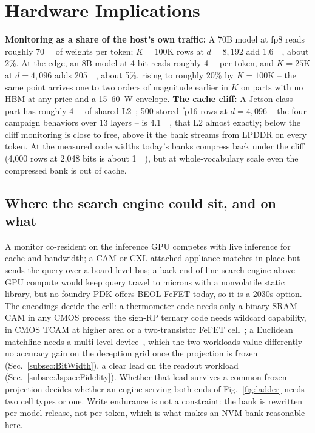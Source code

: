 \documentclass[conference]{IEEEtran}
\newcommand{\cam}{{CAM}\xspace}
\newcommand{\tcam}{{TCAM}\xspace}
\newcommand{\fefet}{{FeFET}\xspace}
\newcommand{\signrp}{{sign-RP}\xspace}
\begin{document}
\section{Hardware Implications}
\label{sec:Hardware}
\label{subsec:Tax}
\label{subsec:CacheCliff}
\textbf{Monitoring as a share of the host's own traffic:} A 70B
model at fp8 reads roughly \qty{70}{\giga\byte} of weights per
token; $K=100$K rows at $d=8{,}192$ add \qty{1.6}{\giga\byte}, about
2\%. At the edge, an 8B model at 4-bit reads roughly
\qty{4}{\giga\byte} per token, and $K=25$K at $d=4{,}096$ adds
\qty{205}{\mega\byte}, about 5\%, rising to roughly 20\% by
$K=100$K -- the same point arrives one to two orders of magnitude
earlier in $K$ on parts with no HBM at any price and a
15--\qty{60}{\watt} envelope.
\textbf{The cache cliff:} A Jetson-class part has roughly
\qty{4}{\mega\byte} of shared L2~\cite{nvidia_thor}; 500 stored fp16
rows at $d=4{,}096$ -- the four campaign behaviors over 13 layers --
is \qty{4.1}{\mega\byte}, that L2 almost exactly; below the cliff
monitoring is close to free, above it the bank streams from LPDDR on
every token. At the measured code widths today's banks compress back
under the cliff (4{,}000 rows at 2{,}048 bits is about
\qty{1}{\mega\byte}), but at whole-vocabulary scale even the
compressed bank is out of cache.

\subsection{Where the search engine could sit, and on what}
\label{subsec:Placement}
\label{subsec:Devices}
A monitor co-resident on the inference GPU competes with live
inference for cache and bandwidth; a \cam or CXL-attached appliance matches in place but sends
the query over a board-level bus; a back-end-of-line search engine
above GPU compute would keep query travel to microns with a
nonvolatile static library, but no foundry PDK offers BEOL \fefet
today, so it is a 2030s option.
The encodings decide the cell: a thermometer code needs only a
binary SRAM \cam in any CMOS process; the \signrp ternary code needs
wildcard capability, in CMOS \tcam at higher area or a two-transistor
\fefet cell~\cite{ni2019fetcam}; a Euclidean matchline needs a
multi-level device~\cite{kazemi2021fefetcam}, which the two workloads
value differently -- no accuracy gain on the deception grid once the
projection is frozen (Sec.~\ref{subsec:BitWidth}), a clear lead on
the readout workload (Sec.~\ref{subsec:JspaceFidelity}). Whether that
lead survives a common frozen projection decides whether an engine
serving both ends of Fig.~\ref{fig:ladder} needs two cell types or
one. Write endurance is not a constraint: the bank is rewritten per
model release, not per token, which is what makes an NVM bank
reasonable here.
\end{document}
